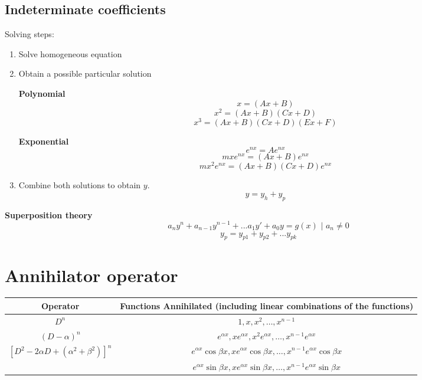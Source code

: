 \documentclass[letterpaper]{article}
\newcommand{\divline}{\noindent\makebox[\linewidth]{\rule{\textwidth}{0.4pt}}}
\begin{document}
    \begin{multicols}{2}
	\section{Indeterminate coefficients}

        Solving steps:
        \begin{enumerate}
            \item Solve homogeneous equation
                
            \item Obtain a possible particular solution
            
                \textbf{Polynomial}
                \[x = (Ax + B)\]
                \[x^{2} = (Ax + B)(Cx + D)\]
                \[x^{3} = (Ax + B)(Cx + D)(Ex + F)\]

                \textbf{Exponential}
                \[e^{nx} = A e^{nx}\]
                \[mxe^{nx} = (Ax + B) e^{nx}\]
                \[mx^{2}e^{nx} = (Ax + B)(Cx + D) e^{nx}\]

            \item Combine both solutions to obtain \(y\).
                \[y = y_{h} + y_{p}\]
        \end{enumerate}

        \textbf{Superposition theory}
        \[a_{n}y^{n} + a_{n-1}y^{n-1} + ... a_{1}y' + a_{0}y = g(x) \text{ | } a_{n} \neq 0\]
        \[y_{p} = y_{p1} + y_{p2} + ... y_{pk}\]
            
    \end{multicols}
 
    \divline
    
    \section{Annihilator operator}

    \begin{center}
        \renewcommand{\arraystretch}{1.5}
        \begin{tabular}{ |c|c| }
            \hline
            Operator & Functions Annihilated (including linear combinations of the functions) \\
            \hline
            $D^{n}$ & $1, x, x^2, \ldots, x^{n-1}$ \\
            \hline
            $(D-\alpha)^{n}$ & $e^{\alpha x}, x e^{\alpha x}, x^2 e^{\alpha x}, \ldots, x^{n-1}e^{\alpha x}$ \\
            \hline
            $[D^{2} - 2 \alpha D + (\alpha^{2} + \beta^{2})]^{n}$ & $e^{\alpha x} \cos{\beta x}, xe^{\alpha x} \cos{\beta x}, \ldots, x^{n-1}e^{\alpha x} \cos{\beta x}$ \\
            & $e^{\alpha x} \sin{\beta x}, xe^{\alpha x} \sin{\beta x}, \ldots, x^{n-1}e^{\alpha x} \sin{\beta x}$ \\
            \hline
        \end{tabular}
    \end{center}
\end{document}
